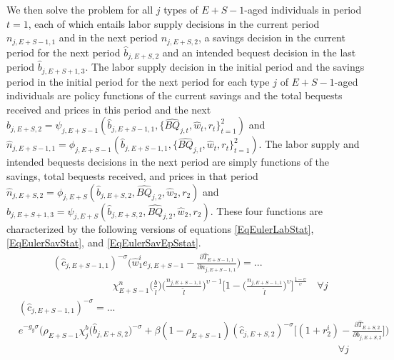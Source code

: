 \documentclass[letterpaper,12pt]{article}
\theoremstyle{definition}
\begin{document}
  We then solve the problem for all $j$ types of $E+S-1$-aged individuals in period $t=1$, each of which entails labor supply decisions in the current period $n_{j,E+S-1,1}$ and in the next period $n_{j,E+S,2}$, a savings decision in the current period for the next period $\hat{b}_{j,E+S,2}$ and an intended bequest decision in the last period $\hat{b}_{j,E+S+1,3}$. The labor supply decision in the initial period and the savings period in the initial period for the next period for each type $j$ of $E+S-1$-aged individuals are policy functions of the current savings and the total bequests received and prices in this period and the next $\hat{b}_{j,E+S,2} = \psi_{j,E+S-1}(\hat{b}_{j,E+S-1,1},\{\hat{BQ}_{j,t},\hat{w}_t,r_t\}_{t=1}^2)$ and $\hat{n}_{j,E+S-1,1} = \phi_{j,E+S-1}(\hat{b}_{j,E+S-1,1},\{\hat{BQ}_{j,t},\hat{w}_t,r_t\}_{t=1}^2)$. The labor supply and intended bequests decisions in the next period are simply functions of the savings, total bequests received, and prices in that period $\hat{n}_{j,E+S,2} = \phi_{j,E+S}(\hat{b}_{j,E+S,2},\hat{BQ}_{j,2},\hat{w}_2,r_2)$ and $\hat{b}_{j,E+S+1,3} = \psi_{j,E+S}(\hat{b}_{j,E+S,2},\hat{BQ}_{j,2},\hat{w}_2,r_2)$. These four functions are characterized by the following versions of equations \eqref{EqEulerLabStat}, \eqref{EqEulerSavStat}, and \eqref{EqEulerSavEpSstat}.
  \begin{equation}\label{EqEulerSm1labt1}
    \begin{split}
      &(\hat{c}_{j,E+S-1,1})^{-\sigma}\Biggl(\hat{w}_1^i e_{j,E+S-1} - \frac{\partial\hat{T}_{E+S-1,1}}{\partial n_{j,E+S-1,1}}\Biggr) = ... \\
      &\qquad\qquad\qquad \chi^n_{E+S-1}\biggl(\frac{b}{\tilde{l}}\biggr)\biggl(\frac{n_{j,E+S-1,1}}{\tilde{l}}\biggr)^{\upsilon-1}\Biggl[1 - \biggl(\frac{n_{j,E+S-1,1}}{\tilde{l}}\biggr)^\upsilon\Biggr]^{\frac{1-\upsilon}{\upsilon}} \quad\forall j
    \end{split}
  \end{equation}
  \begin{equation}\label{EqEulerSm1savt1}
    \begin{split}
      &(\hat{c}_{j,E+S-1,1})^{-\sigma} = ... \\
      &e^{-g_y\sigma}\Biggl(\rho_{E+S-1}\chi^b_j \bigl(\hat{b}_{j,E+S,2}\bigr)^{-\sigma} + \beta(1-\rho_{E+S-1})(\hat{c}_{j,E+S,2})^{-\sigma}\Biggl[(1 + r_2^i) - \frac{\partial \hat{T}_{E+S,2}}{\partial b_{j,E+S,2}}\Biggr]\Biggr) \\
      &\qquad\qquad\qquad\qquad\qquad\qquad\qquad\qquad\qquad\qquad\qquad\qquad\qquad\qquad\qquad\qquad\forall j
    \end{split}
  \end{equation}
\end{document}
